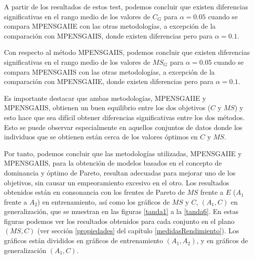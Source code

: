 A partir de los resultados de estos test, podemos concluir que existen diferencias
significativas en el rango medio de los valores de $C_{G}$ para $\alpha=0.05$ cuando se
compara MPENSGAIIE con las otras metodologías, a excepción de la comparación con
MPENSGAIIS, donde existen diferencias pero para $\alpha=0.1$.

Con respecto al método MPENSGAIIS, podemos concluir que existen diferencias
significativas en el rango medio de los valores de $MS_{G}$ para $\alpha=0.05$ cuando se
compara MPENSGAIIS con las otras metodologías, a excepción de la comparación con
MPENSGAIIE, donde existen diferencias pero para $\alpha=0.1$.

Es importante destacar que ambas metodologías, MPENSGAIIE y \\ MPENSGAIIS, obtienen un
buen
equilibrio entre los dos objetivos ($C$ y $MS$) y esto hace que sea difícil obtener
diferencias significativas entre los dos métodos. Esto se puede observar
especialmente en aquellos conjuntos de datos donde los individuos que se obtienen están
cerca de los valores óptimos en $C$ y $MS$.

Por tanto, podemos concluir que las metodologías utilizadas, MPENSGAIIE y MPENSGAIIS, para
la obtención de modelos basados en el concepto de dominancia y óptimo de Pareto, resultan
adecuadas para mejorar
uno de los objetivos, sin causar un empeoramiento excesivo en el otro. Los resultados
obtenidos están en consonancia con los frentes de Pareto de $MS$ frente a $E$
($A_{1}$ frente a $A_{2}$) en entrenamiento, así como los
gráficos de $MS$ y $C$, $(A_{1},C)$ en generalización, que se
muestran en las figuras \ref{tanda1} a la \ref{tanda6}. En estas figuras podemos ver los resultados
obtenidos para cada conjunto en el plano $(MS,C)$ (ver sección \ref{propiedades} del capítulo
\ref{medidasRendimiento}). Los gráficos están divididos en gráficos de entrenamiento
$(A_{1},A_{2})$, y en gráficos de generalización $(A_{1},C)$.


